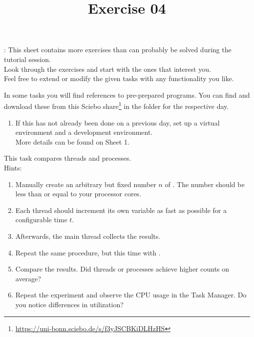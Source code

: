 \documentclass{config/minimal_uebungszettel}
\title{Exercise 04}
\theoremstyle{definition}
\newcommand{\furl}[1]{\footnote{\url{#1}}}
\begin{document}
\maketitle

\noindent {}: \quad
This sheet contains more exercises than can probably be solved during the tutorial session.\\
Look through the exercises and start with the ones that interest you.\\
Feel free to extend or modify the given tasks with any functionality you like.

\medskip

\noindent In some tasks you will find references to pre-prepared programs. You can find and download these from this Sciebo share\furl{https://uni-bonn.sciebo.de/s/f3yJSCBKiDLHzHS} in the folder for the respective day.

\medskip


\noindent {} \quad

    \begin{enumerate}
        \item If this has not already been done on a previous day, set up a virtual environment and a development environment.\\
        More details can be found on Sheet 1.
    \end{enumerate}

\medskip
\medskip

	\noindent {} \quad

\noindent This task compares threads and processes.\\

Hints:
\begin{enumerate}
	\item Manually create an arbitrary but fixed number $n$ of . The number should be less than or equal to your processor cores.
	
	\item Each thread should increment its own variable as fast as possible for a configurable time $t$.
	
	\item Afterwards, the main thread collects the results.
	
	\item Repeat the same procedure, but this time with .
	
	\item Compare the results. Did threads or processes achieve higher counts on average?
	
	\item Repeat the experiment and observe the CPU usage in the Task Manager. Do you notice differences in utilization?
	
\end{enumerate}
\end{document}
